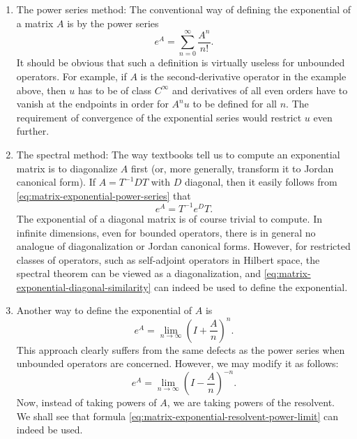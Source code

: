 \begin{enumerate}\item The power series method: The conventional way of defining the exponential of a matrix $A$ is by the power series
\begin{equation}\label{eq:matrix-exponential-power-series}
e^A=\sum_{n=0}^\infty\dfrac{A^n}{n!}.
\end{equation}
It should be obvious that such a definition is virtually useless for unbounded operators. For example, if $A$ is the second-derivative operator in the example above, then $u$ has to be of class $C^\infty$ and derivatives of all even orders have to vanish at the endpoints in order for $A^nu$ to be defined for all $n$. The requirement of convergence of the exponential series would restrict $u$ even further.

\item The spectral method: The way textbooks tell us to compute an exponential matrix is to diagonalize $A$ first (or, more generally, transform it to Jordan canonical form). If $A=T^{-1}DT$ with $D$ diagonal, then it easily follows from \eqref{eq:matrix-exponential-power-series} that
\begin{equation}\label{eq:matrix-exponential-diagonal-similarity}
e^A=T^{-1}e^DT.
\end{equation}
The exponential of a diagonal matrix is of course trivial to compute. In infinite dimensions, even for bounded operators, there is in general no analogue of diagonalization or Jordan canonical forms. However, for restricted classes of operators, such as self-adjoint operators in Hilbert space, the spectral theorem can be viewed as a diagonalization, and \eqref{eq:matrix-exponential-diagonal-similarity} can indeed be used to define the exponential.

\item Another way to define the exponential of $A$ is
\begin{equation}\label{eq:matrix-exponential-positive-power-limit}
e^A=\lim_{n\to\infty}\left(I+\dfrac{A}{n}\right)^n.
\end{equation}
This approach clearly suffers from the same defects as the power series when unbounded operators are concerned. However, we may modify it as follows:
\begin{equation}\label{eq:matrix-exponential-resolvent-power-limit}
e^A=\lim_{n\to\infty}\left(I-\dfrac{A}{n}\right)^{-n}.
\end{equation}
Now, instead of taking powers of $A$, we are taking powers of the resolvent. We shall see that formula \eqref{eq:matrix-exponential-resolvent-power-limit} can indeed be used.


\end{enumerate}
